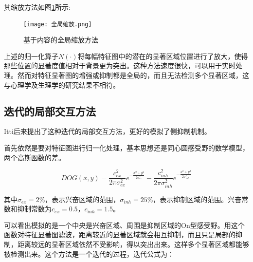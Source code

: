 \documentclass[a4paper,12pt]{article}
\begin{document}
其缩放方法如图\ref{fig:9}所示:

\begin{figure}[!htb]
\centering
\texttt{[image: 全局缩放.png]}
\caption{基于内容的全局缩放方法}
\label{fig:9} 
\end{figure}

上述的归一化算子$N(\cdot)$将每幅特征图中的潜在的显著区域位置进行了放大，使得那些位置的显著度值相对于背景更为突出。这种方法速度很快，可以用于实时处理。然而对特征显著图的增强或抑制都是全局的，而且无法检测多个显著区域，这与心理学及生理学的研究结果不相符。

\subsection{迭代的局部交互方法}

Itti后来\cite{3:article}提出了这种迭代的局部交互方法，更好的模拟了侧抑制机制。


首先依然是要对特征图进行归一化处理，基本思想还是同心圆感受野的数学模型，两个高斯函数的差。

\begin{equation}
DOG(x,y)=\frac{c_{ex}^{2}}{2\pi\sigma_{ex}^{2}}e^{-\frac{x^{2}+y^{2}}{2\sigma_{ex}^{2}}}-\frac{c_{inh}^{2}}{2\pi\sigma_{inh}^{2}}e^{-\frac{x^{2}+y^{2}}{2\sigma_{inh}^{2}}}
\end{equation}

其中$\sigma_{ex}=2\%$，表示兴奋区域的范围，$\sigma_{inh}=25\%$，表示抑制区域的范围。兴奋常数和抑制常数为$c_{ex}=0.5$，$c_{inh}=1.5$。


可以看出模拟的是一个中央是兴奋区域、周围是抑制区域的On型感受野。用这个函数对特征显著图滤波，距离较近的显著区域就会相互抑制，而且只是局部的抑制，距离较远的显著区域依然不受影响，得以突出出来。这样多个显著区域都能够被检测出来。这个方法是一个迭代的过程，迭代公式为：
\end{document}
